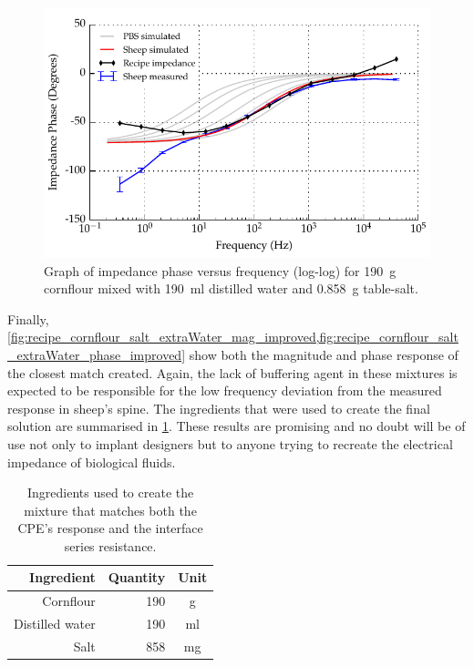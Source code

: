   \begin{figure}
      \centering
      \includegraphics[width=\textwidth]{content/pt2/graphics/run12_190ml-distilledWater_190g-cornflour_0g858-salt_ZVsF_graph_phase}
      \caption{\label{fig:recipe_cornflour_salt_extraWater_phase_improved}Graph of impedance phase versus frequency (log-log) for \SI{190}{\gram} cornflour mixed with \SI{190}{\milli\litre} distilled water and \SI{0.858}{\gram} table-salt.}
  \end{figure}

  Finally, \cref{fig:recipe_cornflour_salt_extraWater_mag_improved,fig:recipe_cornflour_salt_extraWater_phase_improved} show both the magnitude and phase response of the closest match created.
  Again, the lack of buffering agent in these mixtures is expected to be responsible for the low frequency deviation from the measured response in sheep's spine.
  The ingredients that were used to create the final solution are summarised in \cref{tab:pt2-sheep-recipe}.
  These results are promising and no doubt will be of use not only to implant designers but to anyone trying to recreate the electrical impedance of biological fluids.

  \begin{table}
    \centering
    \begin{tabular}{r | r | c}
      Ingredient & Quantity & Unit \\
      \hline
      Cornflour & 190 & g \\
      Distilled water & 190  & ml  \\
      Salt  & 858 & mg  \\
    \end{tabular}
    \caption{\label{tab:pt2-sheep-recipe}Ingredients used to create the mixture that matches both the CPE's response and the interface series resistance.}
  \end{table}

